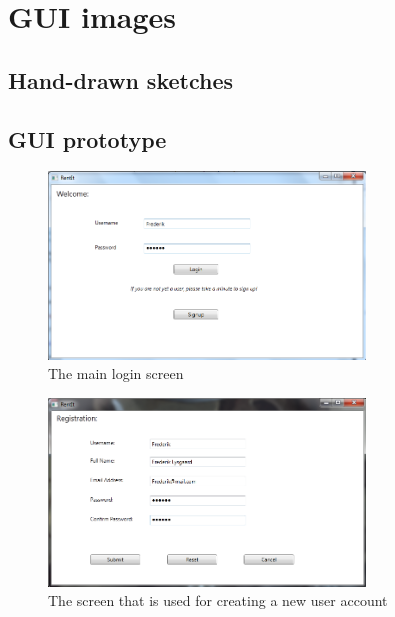 \chapter{GUI images}
\label{Appendix_GUI}

\section{Hand-drawn sketches}
\label{Appendix_GUI_sketches}

\section{GUI prototype}
\label{Appendix_GUI_Prototype}

\begin{figure}[h!]
  \centering
    \includegraphics[width=0.75\textwidth]{Parts/Appendix/Images/Login}
  \caption{The main login screen}
  \label{fig:Appendix_GUI_PrototypeLogin}
\end{figure}

\begin{figure}[h!]
  \centering
    \includegraphics[width=0.75\textwidth]{Parts/Appendix/Images/Signup}
  \caption{The screen that is used for creating a new user account}
  \label{fig:Appendix_GUI_PrototypeSignup}
\end{figure}

